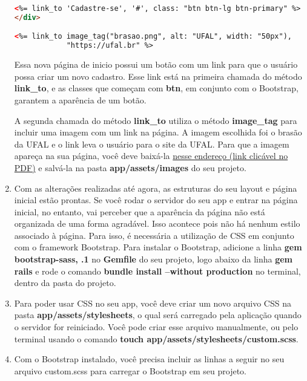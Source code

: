\documentclass[a4paper,12pt]{article}
\begin{document}
\begin{enumerate}
\begin{lstlisting}[language=html, title={app/views/paginas\_estaticas/inicio.html.erb}, basicstyle=\scriptsize]
<%= link_to 'Cadastre-se', '#', class: "btn btn-lg btn-primary" %>
</div>

<%= link_to image_tag("brasao.png", alt: "UFAL", width: "50px"),
            "https://ufal.br" %>
  \end{lstlisting}

  Essa nova página de inicio possui um botão com um link para que o usuário possa criar um novo cadastro. Esse link está na primeira chamada do método \textbf{link\_to}, e as classes que começam com \textbf{btn}, em conjunto com o Bootstrap, garantem a aparência de um botão.

  A segunda chamada do método \textbf{link\_to} utiliza o método \textbf{image\_tag} para incluir uma imagem com um link na página. A imagem escolhida foi o brasão da UFAL e o link leva o usuário para o site da UFAL. Para que a imagem apareça na sua página, você deve baixá-la \href{https://ufal.br/++theme++ufal.tema.tematico/++theme++ufal.tema.tematico/imgs/brasao.png}{nesse endereço (link clicável no PDF)} e salvá-la na pasta \textbf{app/assets/images} do seu projeto.

  \item Com as alterações realizadas até agora, as estruturas do seu layout e página inicial estão prontas. Se você rodar o servidor do seu app e entrar na página inicial, no entanto, vai perceber que a aparência da página não está organizada de uma forma agradável. Isso acontece pois não há nenhum estilo associado à página. Para isso, é necessária a utilização de CSS em conjunto com o framework Bootstrap. Para instalar o Bootstrap, adicione a linha \textbf{gem \textquotesingle bootstrap-sass\textquotesingle, .1\textquotesingle } no \textbf{Gemfile} do seu projeto, logo abaixo da linha \textbf{gem \textquotesingle rails\textquotesingle} e rode o comando \textbf{bundle install --without production} no terminal, dentro da pasta do projeto.

  \item Para poder usar CSS no seu app, você deve criar um novo arquivo CSS na pasta \textbf{app/assets/stylesheets}, o qual será carregado pela aplicação quando o servidor for reiniciado. Você pode criar esse arquivo manualmente, ou pelo terminal usando o comando \textbf{touch app/assets/stylesheets/custom.scss}.

  \item Com o Bootstrap instalado, você precisa incluir as linhas a seguir no seu arquivo custom.scss para carregar o Bootstrap em seu projeto.


\end{enumerate}
\end{document}
